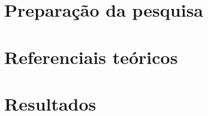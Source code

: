 \documentclass[12pt,            %
               openright,       %
               twoside,         %
               a4paper,         %
               english,         %
               french,          %
               spanish,         %
               brazil]{abntex2} %
\begin{document}
    \textual
    
    
    
    

    \part{Preparação da pesquisa}
    
    

    \part{Referenciais teóricos}

    

    \part{Resultados}

    

    


    

    \postextual

    

    
    
    
    
    
    
    
\end{document}
